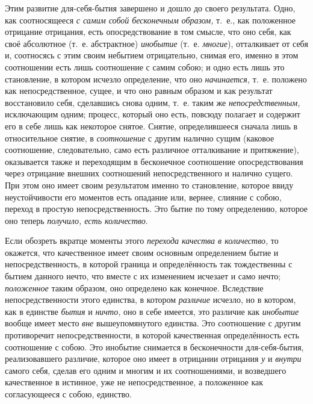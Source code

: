 Этим развитие для-себя-бытия завершено и дошло до своего результата. Одно,
как соотносящееся {\em с самим собой бесконечным
образом,} т.~е., как положенное отрицание отрицания, есть опосредствование
в том смысле, что оно себя, как своё абсолютное (т.~е. абстрактное)
{\em инобытие} (т.~е. {\em многие}), отталкивает от себя и, соотносясь с этим
своим небытием отрицательно, снимая его, именно в этом соотношении есть
лишь соотношение с самим собою; и одно есть лишь это становление, в котором
исчезло определение, что оно {\em начинается,} т.~е.
положено как непосредственное, сущее, и что оно равным образом и как
результат восстановило себя, сделавшись снова одним, т.~е. таким же
{\em непосредственным,} исключающим одним; процесс,
который оно есть, повсюду полагает и содержит его в себе лишь как некоторое
снятое. Снятие, определившееся сначала лишь в относительное снятие, в
{\em соотношение} с другим налично сущим (каковое
соотношение, следовательно, само есть различное отталкивание и
притяжение), оказывается также и переходящим в бесконечное соотношение
опосредствования через отрицание внешних соотношений непосредственного и
налично сущего. При этом оно имеет своим результатом именно то становление,
которое ввиду неустойчивости его моментов есть опадание или, вернее,
слияние с собою, переход в простую непосредственность. Это бытие по тому
определению, которое оно теперь {\em получило, есть количество}.

Если обозреть вкратце моменты этого {\em перехода
качества в количество,} то окажется, что качественное имеет своим основным
определением бытие и непосредственность, в которой граница и определённость
так тождественны с бытием данного нечто, что вместе с их изменением
исчезает и само нечто; {\em положенное} таким образом,
оно определено как конечное. Вследствие непосредственности этого единства,
в котором {\em различие} исчезло, но в котором, как в
единстве {\em бытия} и {\em ничто,}
оно в себе имеется, это различие как {\em инобытие}
вообще имеет место {\em вне} вышеупомянутого единства.
Это соотношение с другим противоречит непосредственности, в которой
качественная определённость есть соотношение с собою. Это инобытие
снимается в бесконечности для-себя-бытия, реализовавшего различие, которое
оно имеет в отрицании отрицания {\em у} и
{\em внутри} самого себя, сделав его одним и многим и
их соотношениями, и возведшего качественное в истинное, уже не
непосредственное, а положенное как согласующееся с собою, единство.

